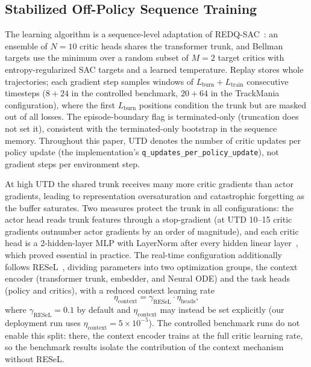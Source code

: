 \documentclass[conference]{IEEEtran}
\begin{document}
\subsection{Stabilized Off-Policy Sequence Training}
\label{sec:training}
The learning algorithm is a sequence-level adaptation of REDQ-SAC~\cite{redq,sac}: an ensemble of $N = 10$ critic heads shares the transformer trunk, and Bellman targets use the minimum over a random subset of $M = 2$ target critics with entropy-regularized SAC targets and a learned temperature. Replay stores whole trajectories; each gradient step samples windows of $L_{\text{burn}} + L_{\text{train}}$ consecutive timesteps ($8 + 24$ in the controlled benchmark, $20 + 64$ in the TrackMania configuration), where the first $L_{\text{burn}}$ positions condition the trunk but are masked out of all losses. The episode-boundary flag is terminated-only (truncation does not set it), consistent with the terminated-only bootstrap in the sequence memory. Throughout this paper, UTD denotes the number of critic updates per policy update (the implementation's \texttt{q\_updates\_per\_policy\_update}), not gradient steps per environment step.

At high UTD the shared trunk receives many more critic gradients than actor gradients, leading to representation oversaturation and catastrophic forgetting as the buffer saturates. Two measures protect the trunk in all configurations: the actor head reads trunk features through a stop-gradient (at UTD 10--15 critic gradients outnumber actor gradients by an order of magnitude), and each critic head is a 2-hidden-layer MLP with LayerNorm after every hidden linear layer~\cite{droq}, which proved essential in practice. The real-time configuration additionally follows RESeL~\cite{resel}, dividing parameters into two optimization groups, the context encoder (transformer trunk, embedder, and Neural ODE) and the task heads (policy and critics), with a reduced context learning rate
\begin{equation}
    \eta_{\text{context}} = \gamma_{\text{RESeL}} \cdot \eta_{\text{heads}},
\end{equation}
where $\gamma_{\text{RESeL}} = 0.1$ by default and $\eta_{\text{context}}$ may instead be set explicitly (our deployment run uses $\eta_{\text{context}} = 5 \times 10^{-5}$). The controlled benchmark runs do not enable this split: there, the context encoder trains at the full critic learning rate, so the benchmark results isolate the contribution of the context mechanism without RESeL.
\end{document}
